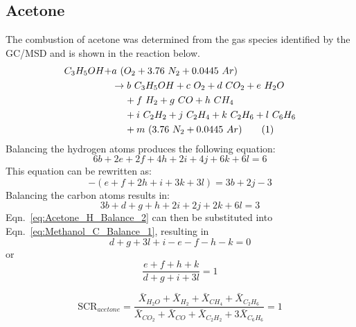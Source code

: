 \documentclass[12pt]{article}
\newcommand\numberthis{\addtocounter{equation}{1}\tag{\theequation}}
\begin{document}
\subsection{Acetone}
\label{ssec:Acetone_SCR}
The combustion of acetone was determined from the gas species identified by the GC/MSD and is shown in the reaction below.
\begin{align*}
C_{3}H_{5}OH+&a~(O_{2}+3.76~N_{2}+0.0445~Ar)\\
&\rightarrow b~C_{3}H_{5}OH+c~O_{2}+ d~CO_{2}+e~H_{2}O\\
&~~~~+f~H_{2}+ g~CO+h~CH_{4}\\
&~~~~+ i~C_{2}H_{2}+j~C_{2}H_{4}+k~C_{2}H_{6}+l~C_{6}H_{6}\\
&~~~~+m~(3.76~N_{2}+0.0445~Ar) \numberthis \label{eq:Ethanol_rxn}
\end{align*}
Balancing the hydrogen atoms produces the following equation:
\begin{equation}
\label{eq:Acetone_H_Balance_1}
6b+2e+2f+4h+2i+4j+6k+6l=6
\end{equation}
This equation can be rewritten as:
\begin{equation}
\label{eq:Acetone_H_Balance_2}
-\left(e+f+2h+i+3k+3l\right)=3b+2j-3
\end{equation}
Balancing the carbon atoms results in:
\begin{equation}
\label{eq:Acetone_C_Balance_1}
3b+d+g+h+2i+2j+2k+6l=3
\end{equation}
Eqn.~\ref{eq:Acetone_H_Balance_2} can then be substituted into Eqn.~\ref{eq:Methanol_C_Balance_1}, resulting in
\begin{equation}
\label{eq:Acetone_C_Balance_2}
d+g+3l+i-e-f-h-k=0
\end{equation}
or 
\begin{equation}
\label{eq:Acetone_SCR}
\frac{e+f+h+k}{d+g+i+3l}=1
\end{equation}

\begin{equation}\label{eq:prod_ratio_acetone}
\text{SCR}_{acetone}=\frac{\bar{X}_{H_2O}+\bar{X}_{H_2}+\bar{X}_{CH_4}+\bar{X}_{C_2H_6}}{\bar{X}_{CO_2}+\bar{X}_{CO}+\bar{X}_{C_2H_2}+3\bar{X}_{C_6H_6}}=1
\end{equation}

\pagebreak
\end{document}
